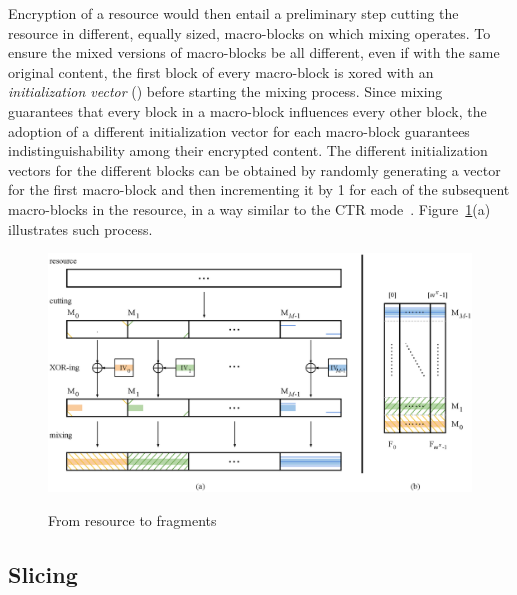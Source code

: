 Encryption of a resource would then entail a preliminary step cutting the resource in different, equally sized, macro-blocks on which mixing operates. To ensure the mixed versions of macro-blocks be all different, even if with the same original content, the first block of every macro-block is {\sc xor}ed with an {\em initialization vector\/} () before starting the mixing process. Since mixing guarantees that every block in a macro-block influences every other block, the adoption of a different initialization vector for each macro-block guarantees indistinguishability among their encrypted content. The different initialization vectors for the different blocks can be obtained by randomly generating a vector for the first macro-block and then incrementing it by 1 for each of the subsequent macro-blocks in the resource, in a way similar to the CTR mode~\cite{d01}. Figure~\ref{ms:fig:mixslice}(a) illustrates such process.

\begin{figure}[!t]
\centering
{\includegraphics[width=\columnwidth]{figures/fig04}}
\caption{\label{ms:fig:mixslice} From resource to fragments}
\end{figure}

\subsection{Slicing}

